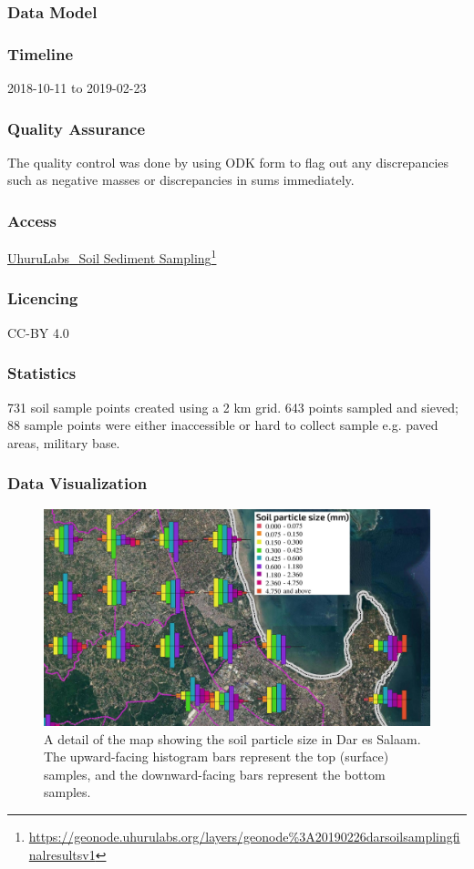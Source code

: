 \documentclass[a4paper,12pt,twoside]{article}
\begin{document}
\subsubsection{Data Model}

\subsubsection{Timeline}
2018-10-11 to 2019-02-23

\subsubsection{Quality Assurance}

The quality control was done by  using ODK form to flag out any discrepancies such as negative masses or discrepancies in sums immediately.

\subsubsection{Access}
\href{https://geonode.uhurulabs.org/layers/geonode\%3A_2019_02_26_dar_soil_sampling_final_results_v1}{UhuruLabs\_Soil Sediment Sampling}\footnote{\url{https://geonode.uhurulabs.org/layers/geonode\%3A20190226darsoilsamplingfinalresultsv1}}

\subsubsection{Licencing}
CC-BY 4.0

\subsubsection{Statistics}
731 soil sample points created using a 2 km grid. 643 points sampled and sieved; 88 sample points were either inaccessible or hard to collect sample e.g. paved areas, military base.

\subsubsection{Data Visualization}
\begin{figure}[h]
  \caption{A detail of the map showing the soil particle size in Dar es Salaam. The upward-facing histogram bars represent the top (surface) samples, and the downward-facing bars represent the bottom samples.}
  \centering
  \includegraphics[width=1\textwidth]{soil_map_detail_peninsula_with_legend}
\end{figure}
\end{document}
